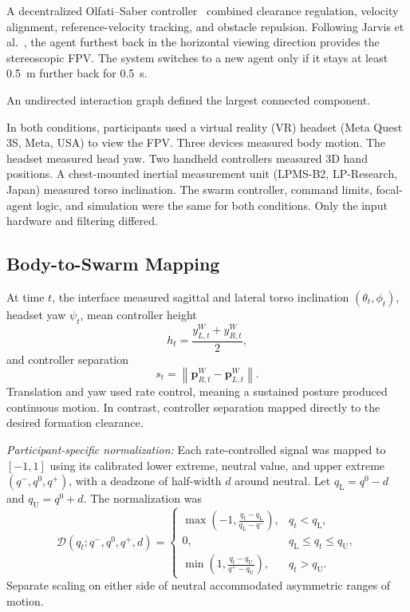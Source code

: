 \documentclass[a4paper,10pt,conference]{ieeeconf}
\begin{document}
A decentralized Olfati--Saber controller~\cite{olfatisaber2006flocking}
combined clearance regulation, velocity alignment, reference-velocity
tracking, and obstacle repulsion. Following Jarvis et al.~\cite{ben_focaldrone}, the agent furthest back in the horizontal viewing direction provides the stereoscopic FPV. The system switches to a new agent only if it stays at least 0.5~m further back for 0.5~s.

An undirected interaction graph defined the largest connected component.

In both conditions, participants used a virtual reality (VR) headset (Meta Quest 3S, Meta, USA) to view the FPV. Three devices measured body motion. The headset measured head yaw. Two handheld controllers measured 3D hand positions. A chest-mounted inertial measurement unit (LPMS-B2, LP-Research, Japan) measured torso inclination. The swarm controller, command limits, focal-agent logic, and simulation were the same for both conditions. Only the input hardware and filtering differed.

\subsection{Body-to-Swarm Mapping}
\label{sec:mapping}

At time $t$, the interface measured sagittal and lateral torso inclination
$(\theta_t,\phi_t)$, headset yaw $\psi_t$, mean controller height
\[
h_t=\frac{y^W_{L,t}+y^W_{R,t}}{2},
\]
and controller separation
\[
s_t=\left\lVert\mathbf{p}^W_{R,t}-\mathbf{p}^W_{L,t}\right\rVert .
\]
Translation and yaw used rate control, meaning a sustained posture produced continuous motion. In contrast, controller separation mapped directly to the desired formation clearance.

\emph{Participant-specific normalization:}
Each rate-controlled signal was mapped to $[-1,1]$ using its calibrated lower
extreme, neutral value, and upper extreme $(q^{-},q^{0},q^{+})$, with a
deadzone of half-width $d$ around neutral. Let
$q_{\mathrm{L}}=q^{0}-d$ and $q_{\mathrm{U}}=q^{0}+d$. The normalization was
\begin{equation}
\mathcal{D}(q_t;q^{-},q^{0},q^{+},d)=
\begin{cases}
\displaystyle
\max\!\left(-1,
\frac{q_t-q_{\mathrm{L}}}{q_{\mathrm{L}}-q^{-}}\right),
& q_t<q_{\mathrm{L}},\\[6pt]
0,
& q_{\mathrm{L}}\leq q_t\leq q_{\mathrm{U}},\\[3pt]
\displaystyle
\min\!\left(1,
\frac{q_t-q_{\mathrm{U}}}{q^{+}-q_{\mathrm{U}}}\right),
& q_t>q_{\mathrm{U}}.
\end{cases}
\label{eq:deadzone_mapping}
\end{equation}
Separate scaling on either side of neutral accommodated asymmetric ranges of
motion.
\end{document}
